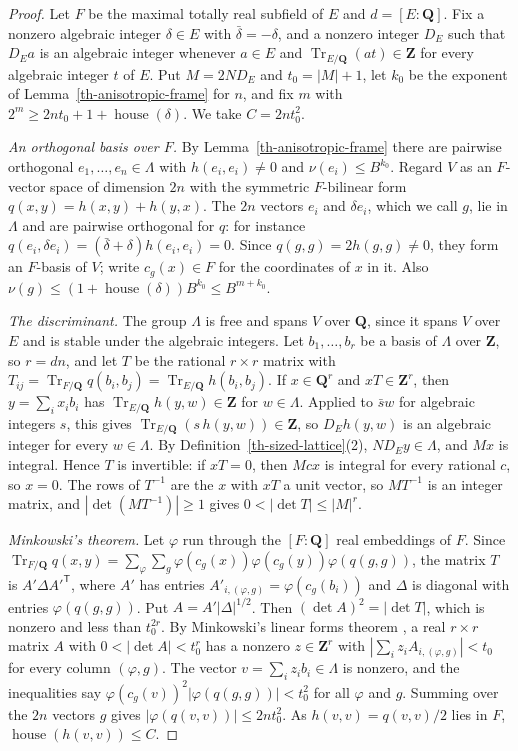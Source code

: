 \begin{proof}
Let $F$ be the maximal totally real subfield of $E$ and $d=[E:\mathbf Q]$. Fix a
nonzero algebraic integer $\delta\in E$ with $\bar\delta=-\delta$, and a nonzero
integer $D_E$ such that $D_Ea$ is an algebraic integer whenever $a\in E$ and
$\operatorname{Tr}_{E/\mathbf Q}(at)\in\mathbf Z$ for every algebraic integer
$t$ of $E$. Put $M=2ND_E$ and $t_0=|M|+1$, let $k_0$ be the exponent of
Lemma~\ref{th-anisotropic-frame} for $n$, and fix $m$ with
$2^m\geq2nt_0+1+\operatorname{house}(\delta)$. We take $C=2nt_0^2$.

\emph{An orthogonal basis over $F$.} By Lemma~\ref{th-anisotropic-frame} there
are pairwise orthogonal $e_1,\ldots,e_n\in\Lambda$ with $h(e_i,e_i)\neq0$ and
$\nu(e_i)\leq B^{k_0}$. Regard $V$ as an $F$-vector space of dimension $2n$ with
the symmetric $F$-bilinear form $q(x,y)=h(x,y)+h(y,x)$. The $2n$ vectors
$e_i$ and $\delta e_i$, which we call $g$, lie in $\Lambda$ and are pairwise
orthogonal for $q$: for instance
$q(e_i,\delta e_i)=(\bar\delta+\delta)h(e_i,e_i)=0$. Since
$q(g,g)=2h(g,g)\neq0$, they form an $F$-basis of $V$; write $c_g(x)\in F$ for
the coordinates of $x$ in it. Also
$\nu(g)\leq(1+\operatorname{house}(\delta))B^{k_0}\leq B^{m+k_0}$.

\emph{The discriminant.} The group $\Lambda$ is free and spans $V$ over
$\mathbf Q$, since it spans $V$ over $E$ and is stable under the algebraic
integers. Let $b_1,\ldots,b_r$ be a basis of $\Lambda$ over $\mathbf Z$, so
$r=dn$, and let $T$ be the rational $r\times r$ matrix with
$T_{ij}=\operatorname{Tr}_{F/\mathbf Q}q(b_i,b_j)=\operatorname{Tr}_{E/\mathbf Q}h(b_i,b_j)$.
If $x\in\mathbf Q^r$ and $xT\in\mathbf Z^r$, then $y=\sum_ix_ib_i$ has
$\operatorname{Tr}_{E/\mathbf Q}h(y,w)\in\mathbf Z$ for $w\in\Lambda$. Applied to
$\bar sw$ for algebraic integers $s$, this gives
$\operatorname{Tr}_{E/\mathbf Q}(s\,h(y,w))\in\mathbf Z$, so $D_Eh(y,w)$ is an
algebraic integer for every $w\in\Lambda$. By
Definition~\ref{th-sized-lattice}(2), $ND_Ey\in\Lambda$, and $Mx$ is integral.
Hence $T$ is invertible: if $xT=0$, then $Mcx$ is integral for every rational
$c$, so $x=0$. The rows of $T^{-1}$ are the $x$ with $xT$ a unit vector, so
$MT^{-1}$ is an integer matrix, and $|\det(MT^{-1})|\geq1$ gives
$0<|\det T|\leq|M|^r$.

\emph{Minkowski's theorem.} Let $\varphi$ run through the $[F:\mathbf Q]$ real
embeddings of $F$. Since
$\operatorname{Tr}_{F/\mathbf Q}q(x,y)=\sum_\varphi\sum_g\varphi(c_g(x))\varphi(c_g(y))\varphi(q(g,g))$,
the matrix $T$ is $A'\Delta A'^{\mathsf T}$, where $A'$ has entries
$A'_{i,(\varphi,g)}=\varphi(c_g(b_i))$ and $\Delta$ is diagonal with entries
$\varphi(q(g,g))$. Put $A=A'|\Delta|^{1/2}$. Then $(\det A)^2=|\det T|$, which
is nonzero and less than $t_0^{2r}$. By Minkowski's linear forms theorem
\cite{Cas59}, a real $r\times r$ matrix $A$ with $0<|\det A|<t_0^r$ has a nonzero
$z\in\mathbf Z^r$ with $|\sum_iz_iA_{i,(\varphi,g)}|<t_0$ for every column
$(\varphi,g)$. The vector $v=\sum_iz_ib_i\in\Lambda$ is nonzero, and the
inequalities say $\varphi(c_g(v))^2|\varphi(q(g,g))|<t_0^2$ for all $\varphi$ and
$g$. Summing over the $2n$ vectors $g$ gives
$|\varphi(q(v,v))|\leq2nt_0^2$. As $h(v,v)=q(v,v)/2$ lies in $F$,
$\operatorname{house}(h(v,v))\leq C$.


\end{proof}
